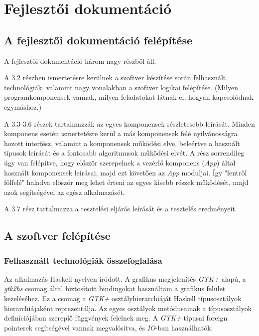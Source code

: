 \chapter{Fejlesztői dokumentáció} %
\label{ch:impl}

\section{A fejlesztői dokumentáció felépítése}

A fejlesztői dokumentáció három nagy részből áll. 

A 3.2 részben ismertetésre kerülnek a szoftver készítése során felhasznált technológiák, valamint nagy vonalakban a szoftver logikai felépítése. (Milyen programkomponensek vannak, milyen feladatokat látnak el, hogyan kapcsolódnak egymáshoz.) 

A 3.3-3.6 részek tartalmazzák az egyes komponensek részletesebb leírását. Minden komponens esetén ismertetésre kerül a más komponensek felé nyilvánosságra hozott interfész, valamint a komponensek működési elve, beleértve a használt típusok leírását és a fontosabb algoritmusok működési elvét. A rész sorrendileg úgy van felépítve, hogy először szerepelnek a vezérlő komponens (\textit{App}) által használt komponensek leírásai, majd ezt követően az \textit{App} moduljai. Így "lentről fölfelé" haladva először meg lehet érteni az egyes kisebb részek működését, majd azok segítségével az egész alkalmazásét.

A 3.7 rész tartalmazza a tesztelési eljárás leírását és a tesztelés eredményeit. 

\section{A szoftver felépítése}

\subsection{Felhasznált technológiák összefoglalása}

Az alkalmazás Haskell nyelven íródott. A grafikus megjelenítés \textit{GTK+} alapú, a \textit{gtk2hs} csomag által biztosított bindingokat használtam a grafikus felület kezeléséhez. Ez a csomag a \textit{GTK+} osztályhierarchiáját Haskell típusosztályok hierarchiájaként reprezentálja. Az egyes osztályok metódusainak a típusosztályok definíciójában szereplő függvények felelnek meg. A \textit{GTK+} típusai foreign pointerek segítségével vannak megvalósítva, és \textit{IO}-ban használhatók. 

